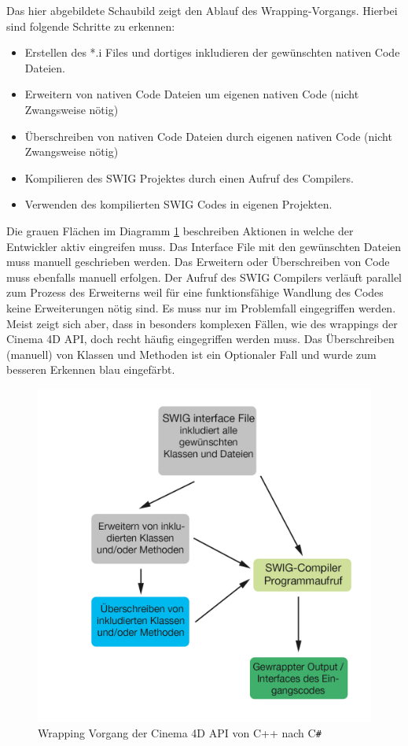 \documentclass[pagesize, paper=a4, fontsize=12pt, titlepage=true, headings=small, headnosepline, abstractoff, liststotoc, nochapterprefix, plainheadsepline, twoside]{scrreprt}
\newcommand{\CS}{C\texttt{\#}}
\begin{document}
Das hier abgebildete Schaubild zeigt den Ablauf des Wrapping-Vorgangs. Hierbei sind folgende Schritte zu erkennen:
\begin{itemize}
\item Erstellen des *.i Files und dortiges inkludieren der gewünschten nativen Code Dateien.
\item Erweitern von nativen Code Dateien um eigenen nativen Code (nicht Zwangsweise nötig)
\item Überschreiben von nativen Code Dateien durch eigenen nativen Code (nicht Zwangsweise nötig)
\item Kompilieren des SWIG Projektes durch einen Aufruf des Compilers.
\item Verwenden des kompilierten SWIG Codes in eigenen Projekten.
\end{itemize}

Die grauen Flächen im Diagramm \ref{SWIG wrapping Vorgang} beschreiben Aktionen in welche der Entwickler aktiv eingreifen muss. Das Interface File mit den gewünschten Dateien muss manuell geschrieben werden. Das Erweitern oder Überschreiben von Code muss ebenfalls manuell erfolgen. Der Aufruf des SWIG Compilers verläuft parallel zum Prozess des Erweiterns weil für eine funktionsfähige Wandlung des Codes keine Erweiterungen nötig sind. Es muss nur im Problemfall eingegriffen werden. Meist zeigt sich aber, dass in besonders komplexen Fällen, wie des wrappings der Cinema 4D API, doch recht häufig eingegriffen werden muss. Das Überschreiben (manuell) von Klassen und Methoden ist ein Optionaler Fall und wurde zum besseren Erkennen blau eingefärbt.
\begin{figure}[ht]
	\centering
	\includegraphics[width=\linewidth]{Bilder/swig_wrapping_csharp.jpg}
	\caption{Wrapping Vorgang der Cinema 4D API von C++ nach \CS}
	\label{SWIG wrapping Vorgang}
\end{figure}
\end{document}
